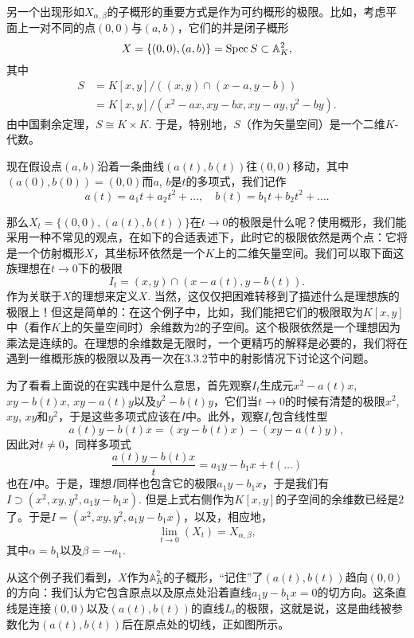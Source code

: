 另一个出现形如$X_{\alpha,\beta}$的子概形的重要方式是作为可约概形的极限。比如，考虑平面上一对不同的点$(0,0)$与$(a,b)$，它们的并是闭子概形
\[
	X=\{(0,0),(a,b)\}=\operatorname{Spec} S\subset \mathbb{A}_K^2,
\]
其中
\[
\begin{aligned}
	S&=K[x,y]/\left((x,y)\cap (x-a,y-b)\right)\\
	&=K[x,y]/(x^2-ax,xy-bx,xy-ay,y^2-by).
\end{aligned}
\]
由中国剩余定理，$S\cong K\times K$. 于是，特别地，$S$（作为矢量空间）是一个二维$K$-代数。

现在假设点$(a,b)$沿着一条曲线$(a(t),b(t))$往$(0,0)$移动，其中$(a(0),b(0))=(0,0)$而$a$, $b$是$t$的多项式，我们记作
\[
	a(t)=a_1t+a_2t^2+\dots,\quad b(t)=b_1t+b_2t^2+\dots.
\]


那么$X_t=\{(0,0),(a(t),b(t))\}$在$t\to 0$的极限是什么呢？使用概形，我们能采用一种不常见的观点，在如下的合适表述下，此时它的极限依然是两个点：它将是一个仿射概形$X$，其坐标环依然是一个$K$上的二维矢量空间。我们可以取下面这族理想在$t\to 0$下的极限
\[
	I_t=(x,y)\cap (x-a(t),y-b(t)).
\]
作为关联于$X$的理想来定义$X$. 当然，这仅仅把困难转移到了描述什么是理想族的极限上！但这是简单的：在这个例子中，比如，我们能把它们的极限取为$K[x,y]$
中（看作$K$上的矢量空间时）余维数为$2$的子空间。这个极限依然是一个理想因为乘法是连续的。在理想的余维数是无限时，一个更精巧的解释是必要的，我们将在遇到一维概形族的极限以及再一次在3.3.2节中的射影情况下讨论这个问题。\nottran

为了看看上面说的在实践中是什么意思，首先观察$I_t$生成元$x^2-a(t)x$, $xy-b(t)x$, $xy-a(t)y$以及$y^2-b(t)y$，它们当$t\to 0$的时候有清楚的极限$x^2$, $xy$, $xy$和$y^2$，于是这些多项式应该在$I$中。此外，观察$I_t$包含线性型
\[
	a(t)y-b(t)x=(xy-b(t)x)-(xy-a(t)y),
\]
因此对$t\neq 0$，同样多项式
\[
	\frac{a(t)y-b(t)x}{t}=a_1y-b_1x+t(\dots)
\]
也在$I$中。于是，理想$I$同样也包含它的极限$a_1y-b_1x$，于是我们有$I\supset (x^2,xy,y^2,a_1y-b_1x)$. 但是上式右侧作为$K[x,y]$的子空间的余维数已经是$2$了。于是$I=(x^2,xy,y^2,a_1y-b_1x)$，以及，相应地，
\[
	\lim_{t\to 0}(X_t)=X_{\alpha,\beta},
\]
其中$\alpha=b_1$以及$\beta=-a_1$.

从这个例子我们看到，$X$作为$\mathbb{A}_K^2$的子概形，“记住”了$(a(t),b(t))$趋向$(0,0)$的方向：我们认为它包含原点以及原点处沿着直线$a_1y-b_1x=0$的切方向。这条直线是连接$(0,0)$以及$(a(t),b(t))$的直线$L_t$的极限，这就是说，这是曲线被参数化为$(a(t),b(t))$后在原点处的切线，正如图所示。

